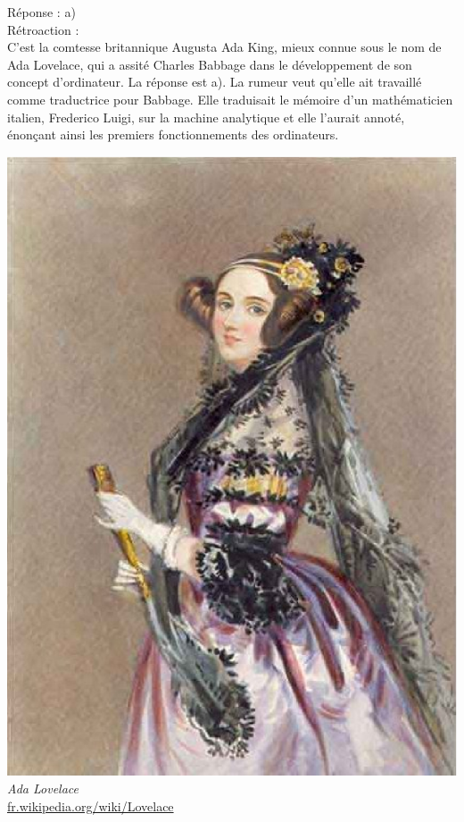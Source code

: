 \documentclass[letterpaper, 12pt]{article}
\begin{document}
R\'eponse : a)\\

R\'etroaction :\\
C'est la comtesse britannique Augusta Ada King, mieux connue sous le nom de Ada Lovelace, qui a assit\'e Charles Babbage dans le d\'eveloppement de son concept d'ordinateur. La r\'eponse est a). La rumeur veut qu'elle ait travaill\'e comme traductrice pour Babbage. Elle traduisait le m\'emoire d'un math\'ematicien italien, Frederico Luigi, sur la machine analytique et elle l'aurait annot\'e, \'enon\c cant ainsi les premiers fonctionnements des ordinateurs.
\begin{center}
\includegraphics[scale=0.15]{Ada_lovelace.eps}\\
\emph{{\small Ada Lovelace}}\\
\href{http://fr.wikipedia.org/wiki/Lovelace}{fr.wikipedia.org/wiki/Lovelace}\\[5mm]
\end{center}
\end{document}
